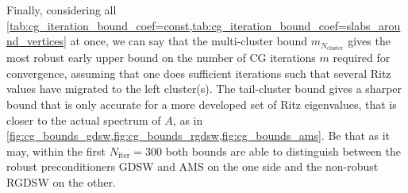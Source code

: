 Finally, considering all \cref{tab:cg_iteration_bound_coef=const,tab:cg_iteration_bound_coef=slabs_around_vertices} at once, we can say that the multi-cluster bound $m_{N_{\text{cluster}}}$ gives the most robust early upper bound on the number of CG iterations $m$ required for convergence, assuming that one does sufficient iterations such that several Ritz values have migrated to the left cluster(s). The tail-cluster bound gives a sharper bound that is only accurate for a more developed set of Ritz eigenvalues, that is closer to the actual spectrum of $A$, as in \cref{fig:cg_bounds_gdsw,fig:cg_bounds_rgdsw,fig:cg_bounds_ams}. Be that as it may, within the first $N_{\text{iter}} = 300$ both bounds are able to distinguish between the robust preconditioners GDSW and AMS on the one side and the non-robust RGDSW on the other.